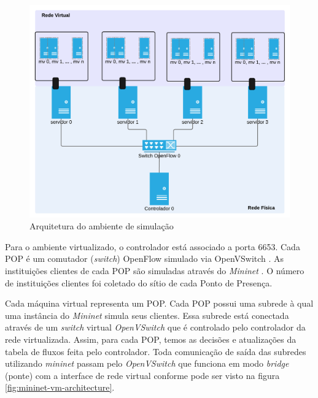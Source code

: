 \begin{figure}[!h]
    \centering
    \label{fig:physical-vs-virtual-network}
    \includegraphics[width=\textwidth]{img/physical-vs-virtual-network-pt}
    \caption{Arquitetura do ambiente de simulação}
\end{figure}

Para o ambiente virtualizado, o controlador está associado a porta 6653.
Cada POP é um comutador (\emph{switch}) OpenFlow simulado via OpenVSwitch
\citep{openvswitch2015switch}.
As instituições clientes de cada POP são simuladas através do \emph{Mininet} 
\citep{lantz2010network}.
O número de instituições clientes foi coletado do sítio de cada Ponto de 
Presença.

Cada máquina virtual representa um POP.
Cada POP possui uma subrede à qual uma instância do \emph{Mininet} simula 
seus clientes. 
Essa subrede está conectada através de um \emph{switch} virtual 
\emph{OpenVSwitch} que é controlado pelo controlador da rede virtualizada.
Assim, para cada POP, temos as decisões e atualizações da tabela de fluxos
feita pelo controlador.
Toda comunicação de saída das subredes utilizando \emph{mininet} passam pelo 
\emph{OpenVSwitch} que funciona em modo \emph{bridge} (ponte) com a interface
de rede virtual conforme pode ser visto na figura
\ref{fig:mininet-vm-architecture}.



